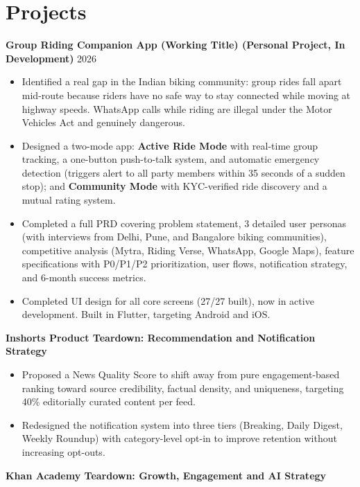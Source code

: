 \documentclass[10pt]{article}
\begin{document}
\section*{Projects}
\textbf{Group Riding Companion App (Working Title) (Personal Project, In Development)} \hfill 2026 \\[-4pt]
\vspace{-8pt}
\begin{itemize}
  \item Identified a real gap in the Indian biking community: group rides fall apart mid-route because riders have no safe way to stay
  connected while moving at highway speeds. WhatsApp calls while riding are illegal under the Motor Vehicles Act and genuinely
  dangerous.
  \item Designed a two-mode app: \textbf{Active Ride Mode} with real-time group tracking, a one-button push-to-talk system, and
  automatic emergency detection (triggers alert to all party members within 35 seconds of a sudden stop); and \textbf{Community
  Mode} with KYC-verified ride discovery and a mutual rating system.
  \item Completed a full PRD covering problem statement, 3 detailed user personas (with interviews from Delhi, Pune, and Bangalore
  biking communities), competitive analysis (Mytra, Riding Verse, WhatsApp, Google Maps), feature specifications with P0/P1/P2
  prioritization, user flows, notification strategy, and 6-month success metrics.
  \item Completed UI design for all core screens (27/27 built), now in active development. Built in Flutter, targeting Android and
  iOS.
\end{itemize}
\vspace{4pt}
\textbf{Inshorts Product Teardown: Recommendation and Notification Strategy} \\[-4pt]
\vspace{-8pt}
\begin{itemize}
  \item Proposed a News Quality Score to shift away from pure engagement-based ranking toward source credibility, factual density,
  and uniqueness, targeting 40\% editorially curated content per feed.
  \item Redesigned the notification system into three tiers (Breaking, Daily Digest, Weekly Roundup) with category-level opt-in to
  improve retention without increasing opt-outs.
\end{itemize}
\vspace{4pt}
\textbf{Khan Academy Teardown: Growth, Engagement and AI Strategy} \\[-4pt]
\end{document}
